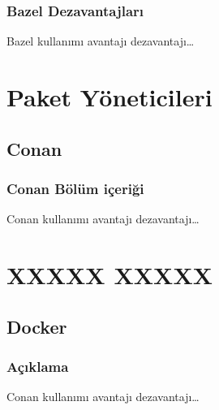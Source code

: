 \documentclass[
]{book}
\begin{document}
\hypertarget{bazel-dezavantajlarux131}{%
\section{Bazel Dezavantajları}\label{bazel-dezavantajlarux131}}

Bazel kullanımı avantajı dezavantajı\ldots{}

\hypertarget{part-paket-yuxf6neticileri}{%
\part{Paket Yöneticileri}\label{part-paket-yuxf6neticileri}}

\hypertarget{conan}{%
\chapter{Conan}\label{conan}}

\hypertarget{conan-buxf6luxfcm-iuxe7eriux11fi}{%
\section{Conan Bölüm içeriği}\label{conan-buxf6luxfcm-iuxe7eriux11fi}}

Conan kullanımı avantajı dezavantajı\ldots{}

\hypertarget{part-xxxxx-xxxxx}{%
\part{XXXXX XXXXX}\label{part-xxxxx-xxxxx}}

\hypertarget{docker}{%
\chapter{Docker}\label{docker}}

\hypertarget{auxe7ux131klama-1}{%
\section{Açıklama}\label{auxe7ux131klama-1}}

Conan kullanımı avantajı dezavantajı\ldots{}
\end{document}

